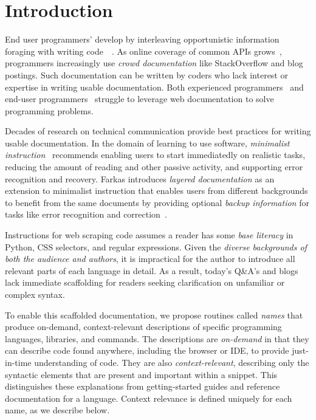 \section{Introduction}

End user programmers' develop by interleaving opportunistic information foraging with writing code~\cite{brandt_two_2009}~\cite{brandt_example-centric_2010}.
As online coverage of common APIs grows~\cite{parnin_measuring_2011}, programmers increasingly use \emph{crowd documentation} like StackOverflow and blog postings.
Such documentation can be written by coders who lack interest or expertise in writing usable documentation.
Both experienced programmers~\cite{duala-ekoko_asking_2012} and end-user programmers~\cite{dorn_lost_2013}\cite{dorn_learning_2010} struggle to leverage web documentation to solve programming problems.

Decades of research on technical communication provide best practices for writing usable documentation.
In the domain of learning to use software, \emph{minimalist instruction}~\cite{carroll_nurnberg_1990} recommends enabling users to start immediatedly on realistic tasks, reducing the amount of reading and other passive activity, and supporting error recognition and recovery.
Farkas introduces \emph{layered documentation} as an extension to minimalist instruction that enables users from different backgrounds to benefit from the same documents by providing optional \emph{backup information} for tasks like error recognition and correction~\cite{farkas_layering_1998}.

Instructions for web scraping code assumes a reader has some \emph{base literacy} in Python, CSS selectors, and regular expressions.
Given the \emph{diverse backgrounds of both the audience and authors}, it is impractical for the author to introduce all relevant parts of each language in detail.
As a result, today's Q\&A's and blogs lack immediate scaffolding for readers seeking clarification on unfamiliar or complex syntax.

To enable this scaffolded documentation, we propose routines called \emph{\Glspl{name}} that produce on-demand, context-relevant descriptions of specific programming languages, libraries, and commands.
The descriptions are \emph{on-demand} in that they can describe code found anywhere, including the browser or IDE, to provide just-in-time understanding of code.
They are also \emph{context-relevant}, describing only the syntactic elements that are present and important within a snippet.
This distinguishes these explanations from getting-started guides and reference documentation for a language.
Context relevance is defined uniquely for each \gls{name}, as we describe below.

